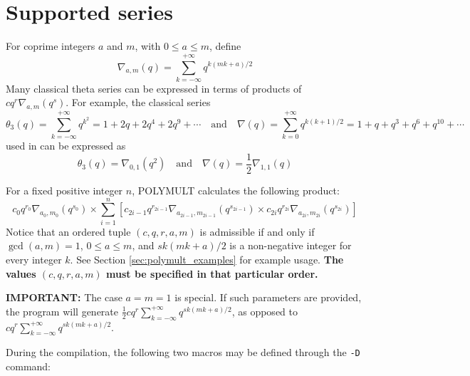 \documentclass[a4paper,10pt]{article}
\newcommand{\code}{\lstinline}
\begin{document}
\section{Supported series} \label{sec:series}

For coprime integers $a$ and $m$, with $0 \leq a \leq m$, define 
%
$$
\nabla_{a, m}(q) = \sum\limits_{k = -\infty}^{+\infty}q^{k(mk + a)/2}
$$
%
Many classical theta series can be expressed in terms of products of $cq^{r}\nabla_{a, m}(q^{s})$. For example, the classical series
%
$$
\theta_3(q) = \sum\limits_{k = -\infty}^{+\infty} q^{k^2} = 1 + 2q + 2q^4 + 2q^9 + \cdots \quad \text{and} \quad \nabla(q) = \sum\limits_{k = 0}^{+\infty} q^{k(k + 1)/2} = 1 + q + q^3 + q^6 + q^{10} + \cdots
$$
%
used in \cite{mosunov} can be expressed as
%
$$
\theta_3(q) = \nabla_{0, 1}(q^2) \quad \text{and} \quad \nabla(q) = \frac{1}{2}\nabla_{1, 1}(q)
$$

For a fixed positive integer $n$, POLYMULT calculates the following product:
%
$$
c_0q^{r_0}\nabla_{a_0, m_0}(q^{s_0}) \times \sum\limits_{i= 1}^n \left[c_{2i - 1}q^{r_{2i - 1}}\nabla_{a_{2i - 1}, m_{2i - 1}}(q^{s_{2i - 1}}) \times c_{2i}q^{r_{2i}}\nabla_{a_{2i}, m_{2i}}(q^{s_{2i}})\right]
$$
%
Notice that an ordered tuple $(c, q, r, a, m)$ is admissible if and only if $\gcd(a, m) = 1$, $0 \leq a \leq m$, and $sk(mk + a)/2$ is a non-negative integer for every integer $k$. See Section \ref{sec:polymult_examples} for example usage. \textbf{The values $(c, q, r, a, m)$ must be specified in that particular order.}

\textbf{IMPORTANT:} The case $a = m = 1$ is special. If such parameters are provided, the program will generate $\frac{1}{2} cq^r\sum_{k = -\infty}^{+\infty}q^{sk(mk + a)/2}$, as opposed to $cq^r\sum_{k = -\infty}^{+\infty}q^{sk(mk + a)/2}$.

During the compilation, the following two macros may be defined through the \code{-D} command:
\end{document}
